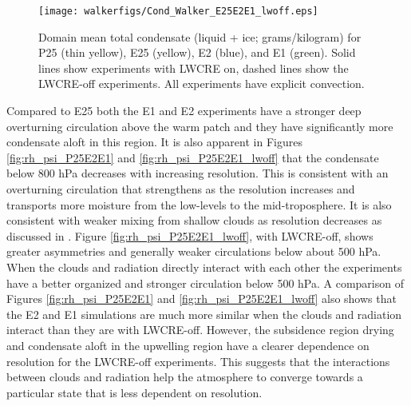 \documentclass[draft]{agujournal2019}
\begin{document}
{\begin{figure}
  \centering
       \texttt{[image: walkerfigs/Cond\_Walker\_E25E2E1\_lwoff.eps]}
          \caption{Domain mean total condensate (liquid + ice; grams/kilogram) for P25 (thin yellow), E25 (yellow), 
          E2 (blue), and E1 (green).  Solid lines show experiments with LWCRE on,
          dashed lines show the LWCRE-off experiments.  All experiments have explicit convection.}
  \label{fig:TotCond}
\end{figure}
 
Compared to E25 both the E1 and E2 experiments have a stronger deep overturning circulation above the warm 
patch and they have significantly more condensate aloft in this region.    It is also apparent in Figures 
\ref{fig:rh_psi_P25E2E1} and \ref{fig:rh_psi_P25E2E1_lwoff} that the condensate below 800 hPa 
decreases with increasing resolution.  
This is consistent with an overturning circulation that 
strengthens as the resolution increases and transports more moisture from the low-levels to the 
mid-troposphere.  It is also consistent with weaker mixing from shallow clouds as resolution decreases as
discussed in .   Figure \ref{fig:rh_psi_P25E2E1_lwoff}, with LWCRE-off, shows greater asymmetries 
and generally weaker circulations below about 500 hPa.  
When the clouds and radiation directly interact with each other the experiments have a better
organized and stronger circulation below 500 hPa.  A comparison of Figures \ref{fig:rh_psi_P25E2E1} and 
\ref{fig:rh_psi_P25E2E1_lwoff} also shows that the E2 and E1 simulations are much more 
similar when the clouds and radiation interact than they are with LWCRE-off.  However, the subsidence 
region drying and condensate aloft in the upwelling region have a clearer dependence on resolution for the
LWCRE-off experiments.  This suggests that the interactions between clouds and radiation help the 
atmosphere to converge towards a particular state that is less dependent on resolution.  
  
}
\end{document}
